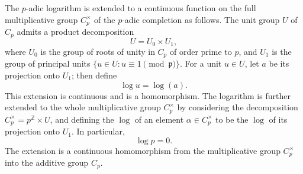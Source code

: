 The $p$-adic logarithm is extended to a continuous function on the full multiplicative group $C_p^\times$ of the $p$-adic completion as follows. The unit group $U$ of $C_p$ admits a product decomposition
$$
U = U_0 \times U_1,
$$
where $U_0$ is the group of roots of unity in $C_p$ of order prime to $p$, and $U_1$ is the group of principal units $\{u \in U : u \equiv 1 \pmod{\mathfrak{p}}\}$. For a unit $u \in U$, let $a$ be its projection onto $U_1$; then define
$$
\log u = \log(a).
$$
This extension is continuous and is a homomorphism. The logarithm is further extended to the whole multiplicative group $C_p^\times$ by considering the decomposition $C_p^\times = p^{\mathbb{Z}} \times U$, and defining the $\log$ of an element $\alpha \in C_p^\times$ to be the $\log$ of its projection onto $U_1$. In particular,
$$
\log p = 0.
$$
The extension is a continuous homomorphism from the multiplicative group $C_p^\times$ into the additive group $C_p$.
